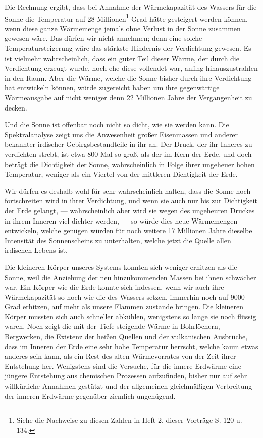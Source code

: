 \documentclass[a4paper, 11pt, oneside, german]{article}
\begin{document}
Die Rechnung ergibt, dass bei Annahme der Wärmekapazität des Wassers für die Sonne die Temperatur auf 28 Millionen\footnote{Siehe die Nachweise zu diesen Zahlen in Heft 2. dieser Vorträge S. 120 u. 134.} Grad hätte gesteigert werden können, wenn diese ganze Wärmemenge jemals ohne Verlust in der Sonne zusammen gewesen wäre. Das dürfen wir nicht annehmen; denn eine solche Temperatursteigerung wäre das stärkste Hindernis der Verdichtung gewesen. Es ist vielmehr wahrscheinlich, dass ein guter Teil dieser Wärme, der durch die Verdichtung erzeugt wurde, noch ehe diese vollendet war, anfing hinauszustrahlen in den Raum. Aber die Wärme, welche die Sonne bisher durch ihre Verdichtung hat entwickeln können, würde zugereicht haben um ihre gegenwärtige Wärmeausgabe auf nicht weniger denn 22 Millionen Jahre der Vergangenheit zu decken.

Und die Sonne ist offenbar noch nicht so dicht, wie sie werden kann. Die Spektralanalyse zeigt uns die Anwesenheit großer Eisenmassen und anderer bekannter irdischer Gebirgsbestandteile in ihr an. Der Druck, der ihr Inneres zu verdichten strebt, ist etwa 800 Mal so groß, als der im Kern der Erde, und doch beträgt die Dichtigkeit der Sonne, wahrscheinlich in Folge ihrer ungeheuer hohen Temperatur, weniger als ein Viertel von der mittleren Dichtigkeit der Erde.

Wir dürfen es deshalb wohl für sehr wahrscheinlich halten, dass die Sonne noch fortschreiten wird in ihrer Verdichtung, und wenn sie auch nur bis zur Dichtigkeit der Erde gelangt, --- wahrscheinlich aber wird sie wegen des ungeheuren Druckes in ihrem Inneren viel dichter werden, --- so würde dies neue Wärmemengen entwickeln, welche genügen würden für noch weitere 17 Millionen Jahre dieselbe Intensität des Sonnenscheins zu unterhalten, welche jetzt die Quelle allen irdischen Lebens ist.

Die kleineren Körper unseres Systems konnten sich weniger erhitzen als die Sonne, weil die Anziehung der neu hinzukommenden Massen bei ihnen schwächer war. Ein Körper wie die Erde konnte sich indessen, wenn wir auch ihre Wärmekapazität so hoch wie die des Wassers setzen, immerhin noch auf 9000 Grad erhitzen, auf mehr als unsere Flammen zustande bringen. Die kleineren Körper mussten sich auch schneller abkühlen, wenigstens so lange sie noch flüssig waren. Noch zeigt die mit der Tiefe steigende Wärme in Bohrlöchern, Bergwerken, die Existenz der heißen Quellen und der vulkanischen Ausbrüche, dass im Inneren der Erde eine sehr hohe Temperatur herrscht, welche kaum etwas anderes sein kann, als ein Rest des alten Wärmevorrates von der Zeit ihrer Entstehung her. Wenigstens sind die Versuche, für die innere Erdwärme eine jüngere Entstehung aus chemischen Prozessen aufzufinden, bisher nur auf sehr willkürliche Annahmen gestützt und der allgemeinen gleichmäßigen Verbreitung der inneren Erdwärme gegenüber ziemlich ungenügend.
\end{document}
